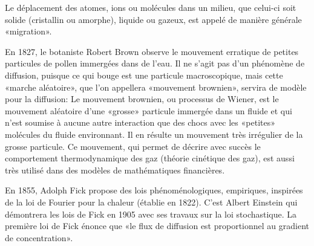 \medskip
\begin{histoire}%
Le déplacement des atomes, ions ou molécules dans un milieu, que celui-ci soit solide (cristallin ou amorphe), 
liquide ou gazeux, est appelé de manière générale «migration». 

\medskip
{}

\medskip
En 1827, le botaniste Robert Brown 
observe le mouvement erratique de petites particules de pollen 
immergées dans de l'eau. Il ne s'agit pas d'un phénomène de diffusion, puisque ce qui bouge est 
une particule macroscopique, mais cette «marche aléatoire», que l'on appellera «mouvement 
brownien», servira de modèle pour la diffusion:
Le mouvement brownien, ou processus de Wiener, 
est le mouvement aléatoire d'une «grosse» particule immergée dans un fluide et qui n'est soumise 
à aucune autre interaction que des chocs avec les «petites» molécules du fluide environnant. 
Il en résulte un mouvement très irrégulier de la grosse particule.
Ce mouvement, qui permet de décrire avec succès le comportement thermodynamique des gaz 
(théorie cinétique des gaz), est aussi très utilisé dans des modèles de mathématiques financières.

\medskip
En 1855, Adolph Fick 
propose des lois phénoménologiques, empiriques, inspirées de la loi de 
Fourier 
pour la chaleur (établie en 1822). 
C'est Albert Einstein 
qui démontrera les lois de Fick 
en 1905 avec ses travaux sur la loi stochastique. 
La première loi de Fick énonce que «le flux de diffusion est proportionnel au gradient de 
concentration».
\end{histoire}

